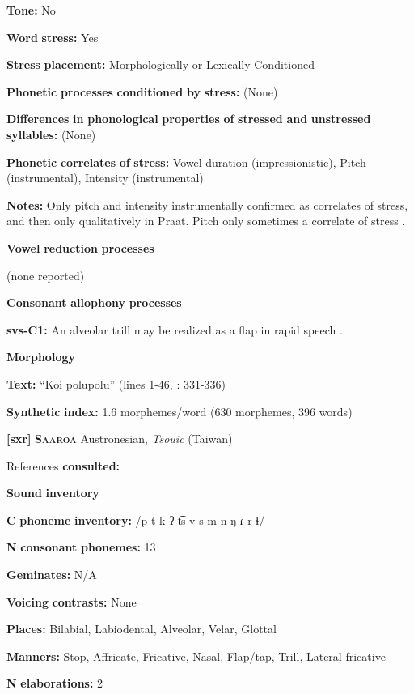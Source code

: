 \begin{styleBody}
\textbf{Tone:} No

\textbf{Word} \textbf{stress:} Yes

\textbf{Stress} \textbf{placement:} Morphologically or Lexically Conditioned

\textbf{Phonetic} \textbf{processes} \textbf{conditioned} \textbf{by} \textbf{stress:} (None)

\textbf{Differences} \textbf{in} \textbf{phonological} \textbf{properties} \textbf{of} \textbf{stressed} \textbf{and} \textbf{unstressed} \textbf{syllables:} (None)

\textbf{Phonetic} \textbf{correlates} \textbf{of} \textbf{stress:} Vowel duration (impressionistic), Pitch (instrumental), Intensity (instrumental)

\textbf{Notes:} Only pitch and intensity instrumentally confirmed as correlates of stress, and then only qualitatively in Praat. Pitch only sometimes a correlate of stress \citet[24]{Wegener2008}.

\textbf{Vowel} \textbf{reduction} \textbf{processes}

(none reported)

\textbf{Consonant} \textbf{allophony} \textbf{processes}

\textbf{svs-C1:} An alveolar trill may be realized as a flap in rapid speech \citep[17]{Wegener2008}.

\textbf{Morphology}

\textbf{Text:} “Koi polupolu” (lines 1-46, \citealt{Wegener2008}: 331-336)

\textbf{Synthetic} \textbf{index:} 1.6 morphemes/word (630 morphemes, 396 words)

\textbf{[sxr]}   \textbf{\textsc{Saaroa}  }  Austronesian, \textit{Tsouic} (Taiwan)

References \textbf{consulted:} \citet{Pan2012}

\textbf{Sound} \textbf{inventory}

\textbf{C} \textbf{phoneme} \textbf{inventory:} /p t k ʔ t͡s v s m n ŋ ɾ r ɬ/

\textbf{N} \textbf{consonant} \textbf{phonemes:} 13

\textbf{Geminates:} N/A

\textbf{Voicing} \textbf{contrasts:} None

\textbf{Places:} Bilabial, Labiodental, Alveolar, Velar, Glottal

\textbf{Manners:} Stop, Affricate, Fricative, Nasal, Flap/tap, Trill, Lateral fricative

\textbf{N} \textbf{elaborations:} 2


\end{styleBody}
